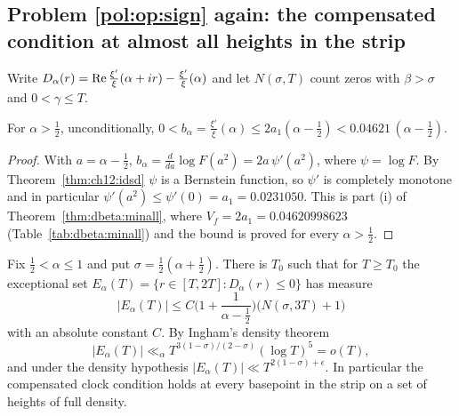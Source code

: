 \subsection{Problem \ref{pol:op:sign} again: the compensated condition at almost all heights in the strip}

Write $D_\alpha(r)=\operatorname{Re}\frac{\xi'}{\xi}(\alpha+ir)-\frac{\xi'}{\xi}(\alpha)$ and let $N(\sigma,T)$ count zeros with $\beta>\sigma$ and $0<\gamma\le T$.

\begin{lemma}\label{pol:lem:Bbound}
For $\alpha>\frac12$, unconditionally, $0<b_\alpha=\frac{\xi'}{\xi}(\alpha)\le2a_1(\alpha-\tfrac12)<0.04621\,(\alpha-\tfrac12)$.
\end{lemma}

\begin{proof}
With $a=\alpha-\frac12$, $b_\alpha=\frac{d}{da}\log F(a^2)=2a\,\psi'(a^2)$, where $\psi=\log F$. By Theorem~\ref{thm:ch12:idsd} $\psi$ is a Bernstein function, so $\psi'$ is completely monotone and in particular $\psi'(a^2)\le\psi'(0)=a_1=0.0231050$. This is part (i) of Theorem~\ref{thm:dbeta:minall}, where $V_f=2a_1=0.04620998623$ (Table~\ref{tab:dbeta:minall}) and the bound is proved for every $\alpha>\frac12$.
\end{proof}

\begin{theorem}\label{pol:thm:almostall}
Fix $\frac12<\alpha\le1$ and put $\sigma=\frac12(\alpha+\frac12)$. There is $T_0$ such that for $T\ge T_0$ the exceptional set $E_\alpha(T)=\{r\in[T,2T]:D_\alpha(r)\le0\}$ has measure
\begin{equation}\label{pol:eq:almostall}
|E_\alpha(T)|\le C\Big(1+\frac{1}{\alpha-\frac12}\Big)\big(N(\sigma,3T)+1\big)
\end{equation}
with an absolute constant $C$. By Ingham's density theorem \cite{Ingham40}
\[
|E_\alpha(T)|\ll_\alpha T^{3(1-\sigma)/(2-\sigma)}(\log T)^5=o(T),
\]
and under the density hypothesis $|E_\alpha(T)|\ll T^{2(1-\sigma)+\epsilon}$. In particular the compensated clock condition holds at every basepoint in the strip on a set of heights of full density.
\end{theorem}

